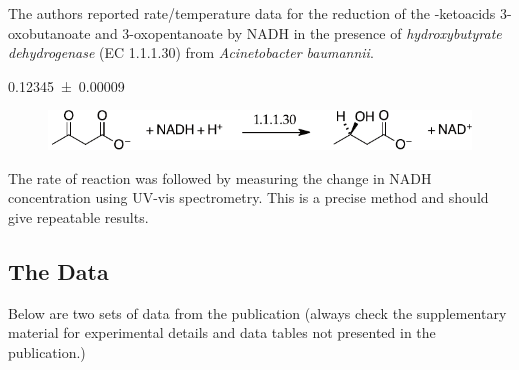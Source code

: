 \documentclass{tufte-handout}
\begin{document}
The authors reported rate/temperature data for the reduction of the \textbeta -ketoacids 3-oxobutanoate and 3-oxopentanoate by NADH in the presence of \textit{hydroxybutyrate dehydrogenase} (EC 1.1.1.30) from \textit{Acinetobacter baumannii}.

\num{0.12345(9)} 

\begin{figure}[h!]
  \centering
  \includegraphics[scale=0.7]{images/HBDH_reaction1.pdf}
  \label{fig:react1}
\end{figure}

The rate of reaction was followed by measuring the change in NADH concentration using UV-vis spectrometry. This is a precise method and should give repeatable results.

\subsection{The Data}

Below are two sets of data from the publication (always check the supplement\-ary material for experimental details and data tables not presented in the publication.)
\end{document}
